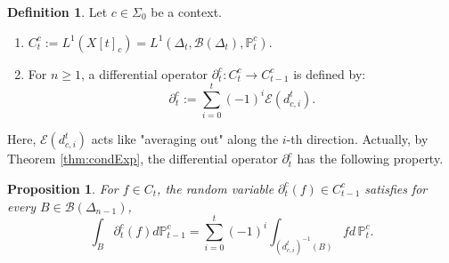 \documentclass[12pt, a4paper]{amsart}
\theoremstyle{plain}
\newtheorem{prop}[thm]{Proposition}
\theoremstyle{definition}
\newtheorem{defn}[thm]{Definition}
\numberwithin{figure}{section}
\numberwithin{table}{section}
\newcommand{\twc}[2]{ %
  [ #1 ]_{ #2 }
}
\numberwithin{equation}{section}
\newcommand{\Prob}{\mathbf{Prob}}
\newcommand{\Ban}{\mathbf{Ban}} %
\newcommand{\bSigma}{\mathbf{\Sigma}}
\begin{document}
\begin{defn}%
\label{defn:HomProbTh}
Let
$
c \in \Sigma_0
$
be a context.
\begin{enumerate}

\item
$
C^c_t
	:=
L^1(X \twc{t}{c})
	=
L^1(\Delta_t, \mathcal{B}(\Delta_t), \mathbb{P}^c_t)
$.

\item
For $n \ge 1$,
a differential operator 
$
\partial^c_t
	:
C^c_t
	\to
C^c_{t-1}
$
is defined by:
\begin{equation}
\label{eq:DeltaDiffOp}
\partial^c_t
	:=
\sum_{i=0}^{t}
	(-1)^i
	\mathcal{E}(d^t_{c,i}) .
\end{equation}

\end{enumerate}
\end{defn}

Here, 
$
\mathcal{E}(d^t_{c,i})
$
acts like "averaging out" along the 
$i$-th direction.
%
Actually, 
by Theorem \ref{thm:condExp},
the differential operator
$\partial^c_t$
has the following property.

\begin{prop}
\label{prop:partialEq}
For
$f \in C_t$,
the random variable
$
\partial^c_t(f)
	\in
C^c_{t-1}
$
satisfies
for every
$B \in \mathcal{B}(\Delta_{n-1})$,
\begin{equation}
\label{eq:partialEq}
\int_B
	\partial^c_t(f)
d \mathbb{P}^c_{t-1}
		=
\sum_{i=0}^{t}
	(-1)^i
	\int_{
		(d^t_{c,i})^{-1}(B)
	}
		f
	d \, \mathbb{P}^c_t .
\end{equation}
\end{prop}
\end{document}
